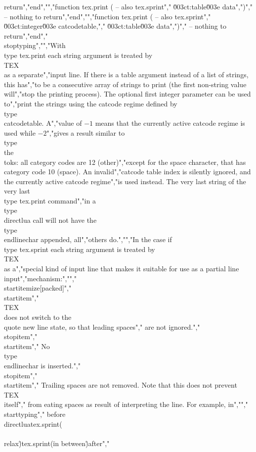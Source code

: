 return","end","","function tex.print ( -- also tex.sprint","    \u003ct:table\u003e data",")","    -- nothing to return","end","","function tex.print ( -- also tex.sprint","    \u003ct:integer\u003e catcodetable,","    \u003ct:table\u003e   data",")","    -- nothing to return","end","\\stoptyping","","With \\type {tex.print} each string argument is treated by \\TEX\\ as a separate","input line. If there is a table argument instead of a list of strings, this has","to be a consecutive array of strings to print (the first non-string value will","stop the printing process). The optional first integer parameter can be used to","print the strings using the catcode regime defined by \\type {\\catcodetable}. A","value of $-1$ means that the currently active catcode regime is used while $-2$","gives a result similar to \\type {\\the\\toks}: all category codes are 12 (other)","except for the space character, that has category code 10 (space). An invalid","catcode table index is silently ignored, and the currently active catcode regime","is used instead. The very last string of the very last \\type {tex.print} command","in a \\type {\\directlua} call will not have the \\type {\\endlinechar} appended, all","others do.","","In the case if \\type {tex.sprint} each string argument is treated by \\TEX\\ as a","special kind of input line that makes it suitable for use as a partial line input","mechanism:","","\\startitemize[packed]","\\startitem","    \\TEX\\ does not switch to the \\quote {new line} state, so that leading spaces","    are not ignored.","\\stopitem","\\startitem","    No \\type {\\endlinechar} is inserted.","\\stopitem","\\startitem","    Trailing spaces are not removed. Note that this does not prevent \\TEX\\ itself","    from eating spaces as result of interpreting the line. For example, in","","    \\starttyping","    before\\directlua{tex.sprint(\"\\\\relax\")tex.sprint(\" in between\")}after","    